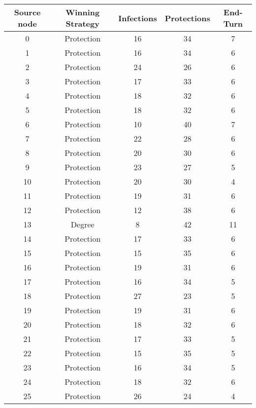 \documentclass[results.tex]{subfiles}
\begin{document}
\begin{center}
  \begin{tabular}{| c || c | c | c | c |}
    \hline
    {\bfseries Source node} & {\bfseries Winning Strategy} & {\bfseries Infections} & {\bfseries Protections} & {\bfseries End-Turn} \\  %
    \hline\hline
    0 & Protection & 16 & 34 & 7 \\ 
    \hline
    1 & Protection & 16 & 34 & 6 \\ 
    \hline
    2 & Protection & 24 & 26 & 6 \\ 
    \hline
    3 & Protection & 17 & 33 & 6 \\ 
    \hline
    4 & Protection & 18 & 32 & 6 \\ 
    \hline
    5 & Protection & 18 & 32 & 6 \\ 
    \hline
    6 & Protection & 10 & 40 & 7 \\ 
    \hline
    7 & Protection & 22 & 28 & 6 \\ 
    \hline
    8 & Protection & 20 & 30 & 6 \\ 
    \hline
    9 & Protection & 23 & 27 & 5 \\ 
    \hline
    10 & Protection & 20 & 30 & 4 \\ 
    \hline
    11 & Protection & 19 & 31 & 6 \\ 
    \hline
    12 & Protection & 12 & 38 & 6 \\ 
    \hline
    13 & Degree & 8 & 42 & 11 \\ 
    \hline
    14 & Protection & 17 & 33 & 6 \\ 
    \hline
    15 & Protection & 15 & 35 & 6 \\ 
    \hline
    16 & Protection & 19 & 31 & 6 \\ 
    \hline
    17 & Protection & 16 & 34 & 5 \\ 
    \hline
    18 & Protection & 27 & 23 & 5 \\ 
    \hline
    19 & Protection & 19 & 31 & 6 \\ 
    \hline
    20 & Protection & 18 & 32 & 6 \\ 
    \hline
    21 & Protection & 17 & 33 & 5 \\ 
    \hline
    22 & Protection & 15 & 35 & 5 \\ 
    \hline
    23 & Protection & 16 & 34 & 5 \\ 
    \hline
    24 & Protection & 18 & 32 & 6 \\ 
    \hline
    25 & Protection & 26 & 24 & 4 \\ 

\end{tabular}
\end{center}
\end{document}
